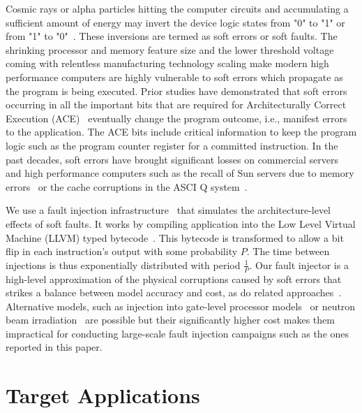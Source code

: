 \documentclass{sig-alternate}
\begin{document}
Cosmic rays or alpha particles hitting the computer circuits and accumulating a sufficient amount of energy may invert the device logic states from "0" to "1" or from "1" to "0"~\cite{Ziegler:1996:TCR:226354.226356,baumann:2005}.
These inversions are termed as soft errors or soft faults.
The shrinking processor and memory feature size and the lower threshold voltage coming with relentless manufacturing technology scaling make modern high performance computers are highly vulnerable to soft errors which propagate as the program is being executed.
Prior studies have demonstrated that soft errors occurring in all the important bits that are required for Architecturally Correct Execution (ACE)~\cite{avf:2003} eventually change the program outcome, i.e., manifest errors to the application.
The ACE bits include critical information to keep the program logic such as the program counter register for a committed instruction.
In the past decades, soft errors have brought significant losses on commercial servers and high performance computers such as the recall of Sun servers due to memory errors~\cite{baumann:2005} or the cache corruptions in the ASCI Q system~\cite{asciQSER:2005}.


We use a fault injection infrastructure~\cite{relax:2010} that simulates the architecture-level effects of soft faults.
It works by compiling application into the Low Level Virtual Machine (LLVM) typed bytecode~\cite{LLVM}.
This bytecode is transformed to allow a bit flip in each instruction's output with some probability $P$.
The time between injections is thus exponentially distributed with period $\frac{1}{P}$.
Our fault injector is a high-level approximation of the physical corruptions caused by soft errors that strikes a balance between model accuracy and cost, as do related approaches~\cite{fault_injection:iyer:1997, avf:2003}.
Alternative models, such as injection into gate-level processor models~\cite{sesee:2004} or neutron beam irradiation~\cite{freq_dep:irom:2004} are possible but their significantly higher cost makes them impractical for conducting large-scale fault injection campaigns such as the ones reported in this paper.

\section{Target Applications}
\label{sec:apps}
\end{document}
